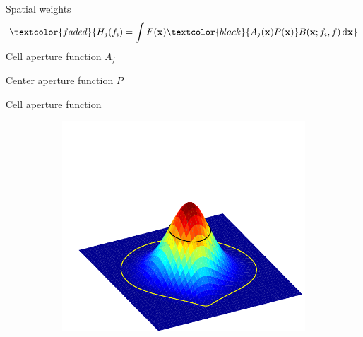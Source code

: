 \documentclass[14pt,t]{beamer}
\def\x{\mathbf{x}}
\begin{document}
%
\begin{frame}{Spatial weights}
\begin{align*}
\textcolor{faded}{H_j(f_i) = \int F(\x) \textcolor{black}{A_j (\x) P (\x)} B(\x; f_i,f) \,\text{d} \x}
\end{align*}
Cell aperture function $A_j$

Center aperture function $P$
\end{frame}
%
\begin{frame}{Cell aperture function}
\begin{figure}
\centering
	\begin{subfigure}[t]{\textwidth}
		\includegraphics[width=\textwidth, clip=true, trim=0 0 0 90]{../defence/img/cellWindowPolar.pdf}
	\end{subfigure}
\end{figure}
\end{frame}
%
\end{document}
